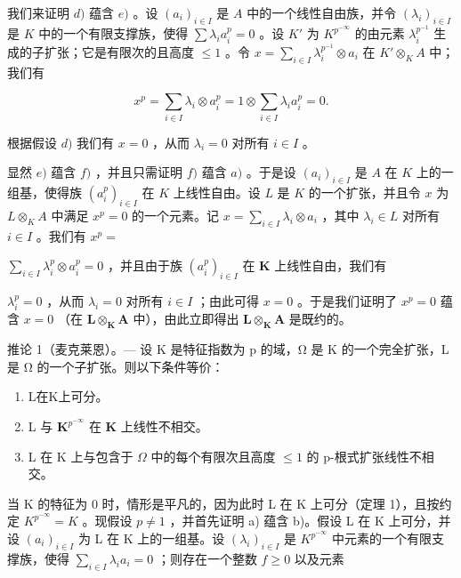 我们来证明 \(d)\) 蕴含 \(e)\) 。设 \((a_i)_{i \in I}\) 是 \(A\) 中的一个线性自由族，并令 \((\lambda_i)_{i \in I}\) 是 \(K\) 中的一个有限支撑族，使得 \(\sum \lambda_i a_i^p = 0\) 。设 \(K'\) 为 \(K^{p^{-\infty}}\) 的由元素 \(\lambda_i^{p^{-1}}\) 生成的子扩张；它是有限次的且高度 \(\leqslant 1\) 。令 \(x = \sum_{i \in I} \lambda_i^{p^{-1}} \otimes a_i\) 在 \(K' \otimes_K A\) 中；我们有

\[
x ^ {p} = \sum_ {i \in I} \lambda_ {i} \otimes a _ {i} ^ {p} = 1 \otimes \sum_ {i \in I} \lambda_ {i} a _ {i} ^ {p} = 0.
\]

根据假设 \(d)\) 我们有 \(x = 0\) ，从而 \(\lambda_i = 0\) 对所有 \(i \in I\) 。

显然 \(e)\) 蕴含 \(f)\) ，并且只需证明 \(f)\) 蕴含 \(a)\) 。于是设 \((a_i)_{i \in I}\) 是 \(A\) 在 \(K\) 上的一组基，使得族 \((a_i^p)_{i \in I}\) 在 \(K\) 上线性自由。设 \(L\) 是 \(K\) 的一个扩张，并且令 \(x\) 为 \(L \otimes_K A\) 中满足 \(x^p = 0\) 的一个元素。记 \(x = \sum_{i \in I} \lambda_i \otimes a_i\) ，其中 \(\lambda_i \in L\) 对所有 \(i \in I\) 。我们有 \(x^p =\)

\(\sum_{i\in I}\lambda_i^p\otimes a_i^p = 0\) ，并且由于族 \((a_i^p)_{i\in I}\) 在 \(\mathbf{K}\) 上线性自由，我们有

\(\lambda_{i}^{p} = 0\) ，从而 \(\lambda_{i} = 0\) 对所有 \(i \in I\) ；由此可得 \(x = 0\) 。于是我们证明了 \(x^{p} = 0\) 蕴含 \(x = 0\) （在 \(\mathbf{L} \otimes_{\mathbf{K}} \mathbf{A}\) 中），由此立即得出 \(\mathbf{L} \otimes_{\mathbf{K}} \mathbf{A}\) 是既约的。

推论 1（麦克莱恩）。--- 设 K 是特征指数为 p 的域，Ω 是 K 的一个完全扩张，L 是 Ω 的一个子扩张。则以下条件等价：

\begin{enumerate}
\def\labelenumi{\alph{enumi})}
\item
  L在K上可分。
\item
  L 与 \(\mathbf{K}^{p^{-\infty}}\) 在 \(\mathbf{K}\) 上线性不相交。
\item
  L 在 K 上与包含于 \(\Omega\) 中的每个有限次且高度 \(\leqslant 1\) 的 p-根式扩张线性不相交。
\end{enumerate}

当 K 的特征为 0 时，情形是平凡的，因为此时 L 在 K 上可分（定理 1），且按约定 \(K^{p^{-\infty}} = K\) 。现假设 \(p \neq 1\) ，并首先证明 a) 蕴含 b)。假设 L 在 K 上可分，并设 \((a_i)_{i \in I}\) 为 L 在 K 上的一组基。设 \((\lambda_i)_{i \in I}\) 是 \(K^{p^{-\infty}}\) 中元素的一个有限支撑族，使得 \(\sum_{i \in I} \lambda_i a_i = 0\) ；则存在一个整数 \(f \geqslant 0\) 以及元素

